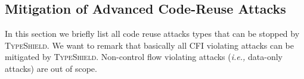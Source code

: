 % 

\subsection{Mitigation of Advanced Code-Reuse Attacks}
\label{RQ7: Mitigation of Advanced Code-Reuse Attacks}
In this section we briefly list all code reuse attacks types that can be 
stopped  by \textsc{TypeShield}. We want to remark that basically all CFI violating 
attacks can be mitigated by \textsc{TypeShield}. Non-control flow violating attacks (\textit{i.e.,} data-only attacks)
are out of scope.

